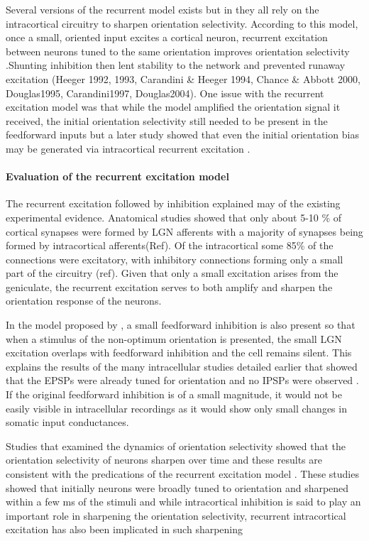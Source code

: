 Several versions of the recurrent model exists but in they all rely on the intracortical circuitry to sharpen orientation selectivity. According to this model, once a small, oriented input excites a cortical neuron, recurrent excitation between neurons tuned to the same orientation improves orientation selectivity \cite{Somers1995, Douglas1991a, Douglas1995}.Shunting inhibition then lent stability to the network and prevented runaway excitation (Heeger 1992, 1993, Carandini \& Heeger 1994, Chance \& Abbott 2000, Douglas1995, Carandini1997, Douglas2004). One issue with the recurrent excitation model was that while the model amplified the orientation signal it received, the initial orientation selectivity still needed to  be present in the feedforward inputs \cite{Douglas1995, Vidyasagar1996b} but a later study showed that even the initial orientation bias may be generated via intracortical recurrent excitation \cite{Adorjan1999}.

\paragraph{Evaluation of the recurrent excitation model}

The recurrent excitation followed by inhibition explained may of the existing experimental evidence. Anatomical studies showed that only about 5-10 \% of cortical synapses were formed by LGN afferents with a majority of synapses being formed by intracortical afferents(Ref). Of the intracortical some 85\% of the connections were excitatory, with inhibitory connections forming only a small part of the circuitry (ref). Given that only a small excitation arises from the geniculate, the recurrent excitation serves to both amplify and sharpen the orientation response of the neurons. 

In the model proposed by \cite{Douglas1995}, a small feedforward inhibition is also present so that when a stimulus of the non-optimum orientation is presented, the small LGN excitation overlaps with feedforward inhibition and the cell remains silent. This explains the results of the many intracellular studies detailed earlier that showed that the EPSPs were  already tuned for orientation and no IPSPs were observed \cite{Ferster1986, Anderson2000}. If the original feedforward inhibition is of a small magnitude, it would not be easily visible in intracellular recordings as it would show only small changes in somatic input conductances.

Studies that examined the dynamics of orientation selectivity showed that the orientation selectivity of neurons sharpen over time and these results are consistent with the predications of the recurrent excitation model \cite{Ringach2002c, Volgushev1995, Pei1994}. These studies showed that initially neurons were broadly tuned to orientation and sharpened within a few ms of the stimuli and while intracortical inhibition is said to play an important role in sharpening the orientation selectivity, recurrent intracortical excitation has also been implicated in such sharpening \cite{Ringach2002c, Vidyasagar1996b, Pei1994, Adorjan1999}

